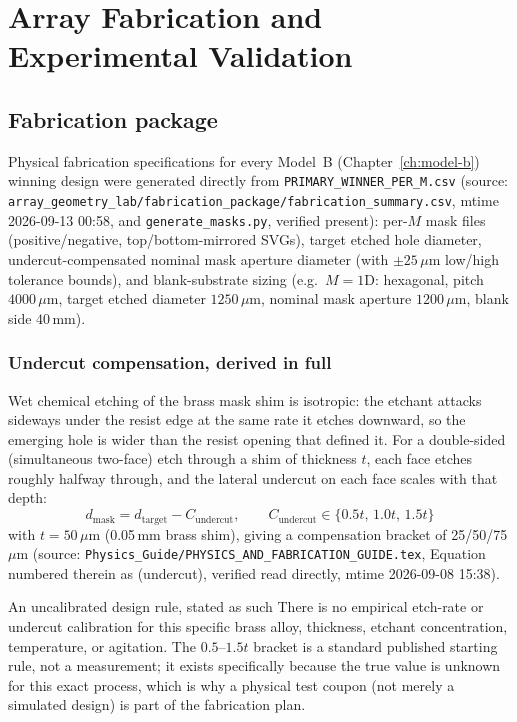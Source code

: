 \chapter{Array Fabrication and Experimental Validation}
\label{ch:array-exp}

\section{Fabrication package}
\label{sec:fabrication}
Physical fabrication specifications for every Model~B (Chapter~\ref{ch:model-b}) winning
design were generated directly from \texttt{PRIMARY\_WINNER\_PER\_M.csv}
(source: \texttt{array\_geometry\_lab/fabrication\_package/fabrication\_summary.csv},
mtime 2026-09-13 00:58, and \texttt{generate\_masks.py}, verified present): per-$M$ mask
files (positive/negative, top/bottom-mirrored SVGs), target etched hole diameter,
undercut-compensated nominal mask aperture diameter (with $\pm25\,\mu$m low/high
tolerance bounds), and blank-substrate sizing (e.g.\ $M=1$D: hexagonal, pitch
$4000\,\mu$m, target etched diameter $1250\,\mu$m, nominal mask aperture $1200\,\mu$m,
blank side $40$\,mm).

\subsection{Undercut compensation, derived in full}
\label{sec:undercut}
Wet chemical etching of the brass mask shim is isotropic: the etchant attacks sideways
under the resist edge at the same rate it etches downward, so the emerging hole is
wider than the resist opening that defined it. For a double-sided (simultaneous
two-face) etch through a shim of thickness $t$, each face etches roughly halfway
through, and the lateral undercut on each face scales with that depth:
\begin{equation}
d_{\mathrm{mask}} = d_{\mathrm{target}} - C_{\mathrm{undercut}}, \qquad
C_{\mathrm{undercut}}\in\{0.5t,\,1.0t,\,1.5t\}
\label{eq:undercut}
\end{equation}
with $t=50\,\mu$m (0.05\,mm brass shim), giving a compensation bracket of
25/50/75\,$\mu$m (source:
\texttt{Physics\_Guide/PHYSICS\_AND\_FABRICATION\_GUIDE.tex}, Equation numbered
therein as (undercut), verified read directly, mtime 2026-09-08 15:38).

\begin{warnbox}{An uncalibrated design rule, stated as such}
There is no empirical etch-rate or undercut calibration for this specific brass alloy,
thickness, etchant concentration, temperature, or agitation. The $0.5$--$1.5t$ bracket
is a standard published starting rule, not a measurement; it exists specifically
because the true value is unknown for this exact process, which is why a physical test
coupon (not merely a simulated design) is part of the fabrication plan.
\end{warnbox}

